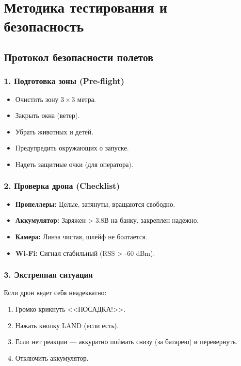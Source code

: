 \section{Методика тестирования и безопасность}

\subsection{Протокол безопасности полетов}

\subsubsection{1. Подготовка зоны (Pre-flight)}
\begin{itemize}
    \item Очистить зону $3 \times 3$ метра.
    \item Закрыть окна (ветер).
    \item Убрать животных и детей.
    \item Предупредить окружающих о запуске.
    \item Надеть защитные очки (для оператора).
\end{itemize}

\subsubsection{2. Проверка дрона (Checklist)}
\begin{itemize}
    \item \textbf{Пропеллеры:} Целые, затянуты, вращаются свободно.
    \item \textbf{Аккумулятор:} Заряжен > 3.8В на банку, закреплен надежно.
    \item \textbf{Камера:} Линза чистая, шлейф не болтается.
    \item \textbf{Wi-Fi:} Сигнал стабильный (RSS > -60 dBm).
\end{itemize}

\subsubsection{3. Экстренная ситуация}
Если дрон ведет себя неадекватно:
\begin{enumerate}
    \item Громко крикнуть <<ПОСАДКА!>>.
    \item Нажать кнопку LAND (если есть).
    \item Если нет реакции — аккуратно поймать снизу (за батарею) и перевернуть.
    \item Отключить аккумулятор.
\end{enumerate}

